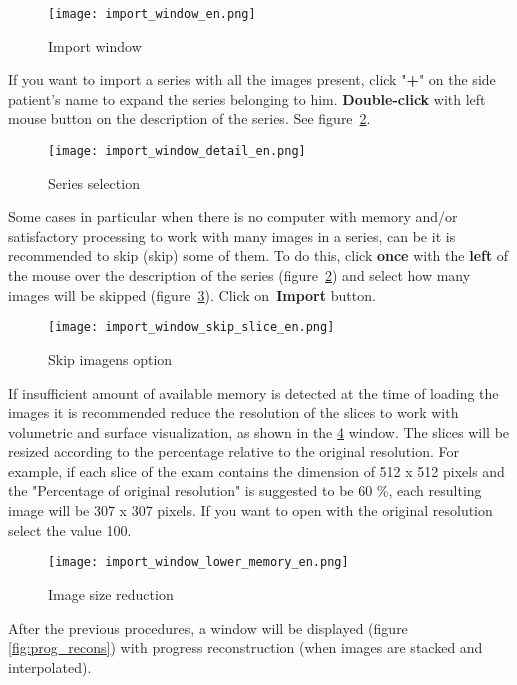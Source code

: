 \begin{figure}[!htb]
\centering
\texttt{[image: import\_window\_en.png]}
\caption{Import window}
\label{fig:win_import}
\end{figure}

\newpage

If you want to import a series with all the images present, click "\textbf{+}" on the side patient's name to expand the series belonging to him. \textbf {Double-click} with left mouse button on the description of the series. See figure~\ref{fig:import_serie}.

\begin{figure}[!htb]
\centering
\texttt{[image: import\_window\_detail\_en.png]}
\caption{Series selection}
\label{fig:import_serie}
\end{figure}
 
Some cases in particular when there is no computer with memory and/or satisfactory processing to work with many images in a series, can be it is recommended to skip (skip) some of them. To do this, click \textbf {once} with the \textbf{left} of the mouse over the description of the series (figure~\ref{fig:import_serie}) and select how many images will be skipped (figure~\ref{fig:skip_image}). Click on~\textbf {Import} button.

\begin{figure}[!htb]
\centering
\texttt{[image: import\_window\_skip\_slice\_en.png]}
\caption{Skip imagens option}
\label{fig:skip_image}
\end{figure}

If insufficient amount of available memory is detected at the time of loading the images it is recommended reduce the resolution of the slices to work with volumetric and surface visualization, as shown in the \ref{fig:resize_image} window.
The slices will be resized according to the percentage relative to the original resolution. For example, if each slice of the exam contains the dimension of 512 x 512 pixels and the "Percentage of original resolution" is suggested to be 60 \%, each resulting image will be 307 x 307 pixels. If you want to open with the original resolution select the value 100.

\begin{figure}[!htb]
\centering
\texttt{[image: import\_window\_lower\_memory\_en.png]}
\caption{Image size reduction}
\label{fig:resize_image}
\end{figure}

After the previous procedures, a window will be displayed (figure \ref{fig:prog_recons}) with progress reconstruction (when images are stacked and interpolated).

